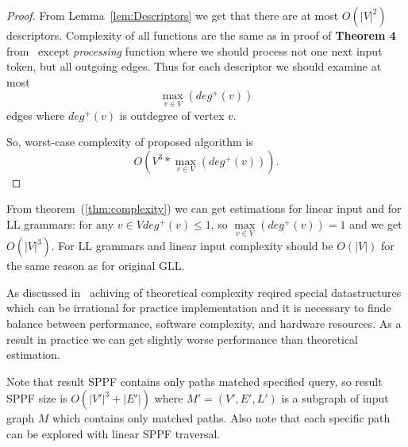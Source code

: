\begin{proof}

From Lemma~\ref{lem:Descriptors} we get that there are at most $O(|V|^2)$ descriptors. 
Complexity of all functions are the same as in proof of \textbf{Theorem 4} from~\cite{gllParsingTree} except \textit{processing} function where we should process not one next input token, but all outgoing edges.
Thus for each descriptor we should examine at most $$\max\limits_{v \in V}\left(deg^+\left(v\right)\right)$$ edges where $deg^+(v)$ is outdegree of vertex $v$.

So, worst-case complexity of proposed algorithm is $$O\left(V^3*\max\limits_{v \in V}\left(deg^+\left(v\right)\right)\right).$$
\end{proof}


From theorem~(\ref{thm:complexity}) we can get estimations for linear input and for LL grammars: $\text{for any } v \in V deg^+(v) \leq 1$, so $\max\limits_{v \in V}(deg^+(v))  = 1 $ and we get $O(|V|^3)$. 
For LL grammars and linear input complexity should be $O(|V|)$ for the same reason as for original GLL.
 

As discussed in~\cite{modellingGLL} achiving of theoretical complexity reqired special datastructures which can be irrational for practice implementation and it is necessary to finde balance between performance, software complexity, and hardware resources.
As a result in practice we can get slightly worse performance than theoretical estimation.

Note that result SPPF contains only paths matched specified query, so result SPPF size is $O(|V'|^3 + |E'|)$ where $M'=(V',E',L')$ is a subgraph of input graph $M$ which contains only matched paths.
Also note that each specific path can be explored with linear SPPF traversal. 
